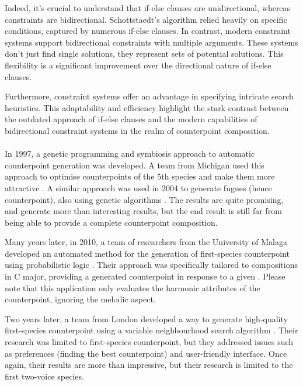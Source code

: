Indeed, it's crucial to understand that if-else clauses are unidirectional, whereas constraints are bidirectional. Schottstaedt's algorithm relied heavily on specific conditions, captured by numerous if-else clauses. In contrast, modern constraint systems support bidirectional constraints with multiple arguments. These systems don't just find single solutions, they represent sets of potential solutions. This flexibility is a significant improvement over the directional nature of if-else clauses.

Furthermore, constraint systems offer an advantage in specifying intricate search heuristics. This adaptability and efficiency highlight the stark contrast between the outdated approach of if-else clauses and the modern capabilities of bidirectional constraint systems in the realm of counterpoint composition.

\paragraph{}
In 1997, a genetic programming and symbiosis approach to automatic counterpoint generation was developed. A team from Michigan used this approach to optimise counterpoints of the 5th species and make them more attractive \cite{polito1997musica}. A similar approach was used in 2004 to generate fugues (hence counterpoint), also using genetic algorithms \cite{garay2004fugue}. The results are quite promising, and generate more than interesting results, but the end result is still far from being able to provide a complete counterpoint composition.

Many years later, in 2010, a team of researchers from the University of Malaga developed an automated method for the generation of first-species counterpoint using probabilistic logic \cite{Aguilera2010}. Their approach was specifically tailored to compositions in C major, providing a generated counterpoint in response to a given \cf. Please note that this application only evaluates the harmonic attributes of the counterpoint, ignoring the melodic aspect.

Two years later, a team from London developed a way to generate high-quality first-species counterpoint using a variable neighbourhood search algorithm \cite{Herremans2012}. Their research was limited to first-species counterpoint, but they addressed issues such as preferences (finding the best counterpoint) and user-friendly interface. Once again, their results are more than impressive, but their research is limited to the first two-voice species.

